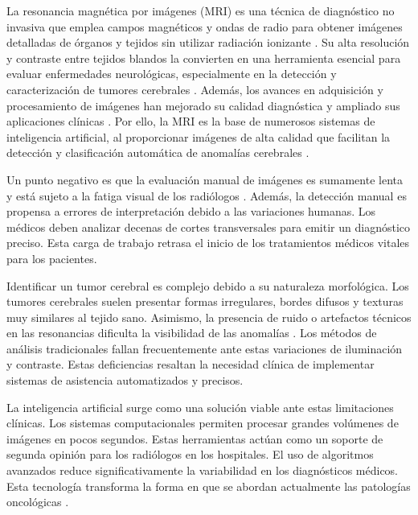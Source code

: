 La resonancia magnética por imágenes (MRI) es una técnica de diagnóstico no invasiva que emplea campos magnéticos y ondas de radio para obtener imágenes detalladas de órganos y tejidos sin utilizar radiación ionizante \cite{AhmedAbdullahAbdulazizALRabah2024}\cite{Taha2024}. Su alta resolución y contraste entre tejidos blandos la convierten en una herramienta esencial para evaluar enfermedades neurológicas, especialmente en la detección y caracterización de tumores cerebrales \cite{AhmedAbdullahAbdulazizALRabah2024}\cite{Hussain2022}. Además, los avances en adquisición y procesamiento de imágenes han mejorado su calidad diagnóstica y ampliado sus aplicaciones clínicas \cite{Alsaedi2024}. Por ello, la MRI es la base de numerosos sistemas de inteligencia artificial, al proporcionar imágenes de alta calidad que facilitan la detección y clasificación automática de anomalías cerebrales \cite{Alsaedi2024}\cite{Hussain2022}\cite{Taha2024}.

Un punto negativo es que la evaluación manual de imágenes es sumamente lenta y está sujeto a la fatiga visual de los radiólogos \cite{Abdusalomov2023}. Además, la detección manual es propensa a errores de interpretación debido a las variaciones humanas. Los médicos deben analizar decenas de cortes transversales para emitir un diagnóstico preciso. Esta carga de trabajo retrasa el inicio de los tratamientos médicos vitales para los pacientes.

Identificar un tumor cerebral es complejo debido a su naturaleza morfológica. Los tumores cerebrales suelen presentar formas irregulares, bordes difusos y texturas muy similares al tejido sano. Asimismo, la presencia de ruido o artefactos técnicos en las resonancias dificulta la visibilidad de las anomalías \cite{Soomro2023}. Los métodos de análisis tradicionales fallan frecuentemente ante estas variaciones de iluminación y contraste. Estas deficiencias resaltan la necesidad clínica de implementar sistemas de asistencia automatizados y precisos.

La inteligencia artificial surge como una solución viable ante estas limitaciones clínicas. Los sistemas computacionales permiten procesar grandes volúmenes de imágenes en pocos segundos. Estas herramientas actúan como un soporte de segunda opinión para los radiólogos en los hospitales. El uso de algoritmos avanzados reduce significativamente la variabilidad en los diagnósticos médicos. Esta tecnología transforma la forma en que se abordan actualmente las patologías oncológicas \cite{Anantharajan2024}.

